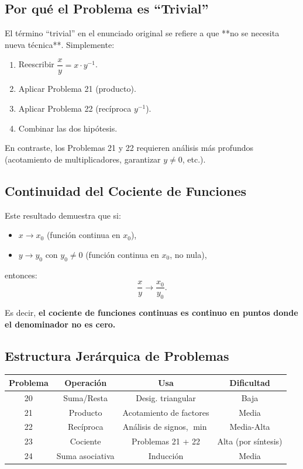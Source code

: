 \subsection*{Por qué el Problema es ``Trivial''}

El término ``trivial'' en el enunciado original se refiere a que **no se necesita nueva técnica**. Simplemente:

\begin{enumerate}
\item Reescribir $\dfrac{x}{y} = x \cdot y^{-1}$.
\item Aplicar Problema 21 (producto).
\item Aplicar Problema 22 (recíproca $y^{-1}$).
\item Combinar las dos hipótesis.
\end{enumerate}

En contraste, los Problemas 21 y 22 requieren análisis más profundos (acotamiento de multiplicadores, garantizar $y \neq 0$, etc.).

\subsection*{Continuidad del Cociente de Funciones}

Este resultado demuestra que si:
\begin{itemize}
\item $x \to x_0$ (función continua en $x_0$),
\item $y \to y_0$ con $y_0 \neq 0$ (función continua en $x_0$, no nula),
\end{itemize}
entonces:
\[
\frac{x}{y} \to \frac{x_0}{y_0}.
\]

Es decir, \textbf{el cociente de funciones continuas es continuo en puntos donde el denominador no es cero.}

\subsection*{Estructura Jerárquica de Problemas}

\begin{center}
\begin{tabular}{|c|c|c|c|}
\hline
\textbf{Problema} & \textbf{Operación} & \textbf{Usa} & \textbf{Dificultad} \\
\hline
20 & Suma/Resta & Desig. triangular & Baja \\
\hline
21 & Producto & Acotamiento de factores & Media \\
\hline
22 & Recíproca & Análisis de signos, $\min$ & Media-Alta \\
\hline
23 & Cociente & Problemas 21 + 22 & Alta (por síntesis) \\
\hline
24 & Suma asociativa & Inducción & Media \\
\hline
\end{tabular}
\end{center}

